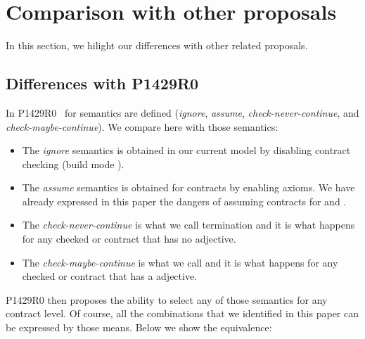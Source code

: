 \section{Comparison with other proposals}
\label{sec:compare}

In this section, we hilight our differences with other related proposals.

\subsection{Differences with P1429R0}

In P1429R0~\cite{p1429r0} for semantics are defined (\emph{ignore}, 
\emph{assume}, \emph{check-never-continue}, and 
\emph{check-maybe-continue}). We compare here with those semantics:

\begin{itemize}
  \item The \emph{ignore} semantics is obtained in our current model
        by disabling contract checking (build mode ).
  \item The \emph{assume} semantics is obtained for 
        contracts by enabling axioms. We have already expressed in this
        paper the dangers of assuming contracts for 
        and .
  \item The \emph{check-never-continue} is what we call termination and
        it is what happens for any checked  or 
        contract that has no  adjective.
  \item The \emph{check-maybe-continue} is what we call  and
        it is what happens for any checked  or 
        contract that has a  adjective.
\end{itemize}

P1429R0 then proposes the ability to select any of those semantics for any
contract level. Of course, all the combinations that we identified in this
paper can be expressed by those means. Below we show the equivalence:

